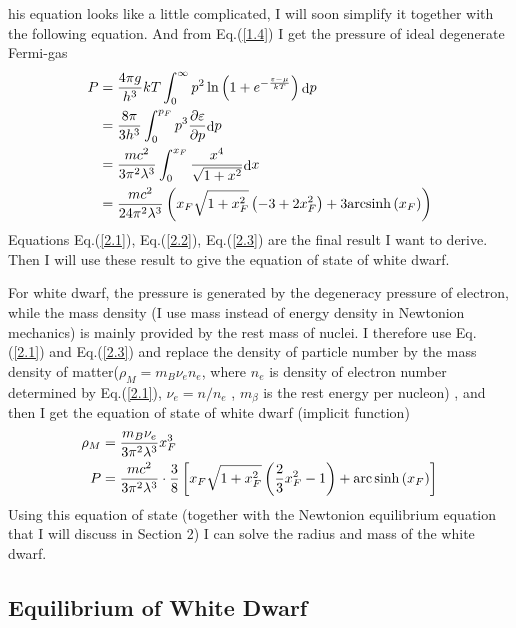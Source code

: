 \documentclass[reprint]{revtex4-1}
\begin{document}
his equation looks like a little complicated, I will soon simplify it together with the following equation. And from Eq.(\ref{1.4}) I get the pressure of ideal degenerate Fermi-gas
\begin{align}
	 P &= {{4\pi g} \over {{h^3}}}kT\int_0^\infty  {{p^2}\ln \left( {1 + {e^{ - {{\varepsilon  - \mu } \over {kT}}}}} \right){\mathop{\rm d}\nolimits} p}  \nonumber \\ 
	& = {{8\pi } \over {3{h^3}}}\int_0^{{p_F}} {{p^3}{{\partial \varepsilon } \over {\partial p}}{\mathop{\rm d}\nolimits} p}    
	 {\rm{       }} \nonumber \\ 
	& = {{m{c^2}} \over {3{\pi ^2}{\lambda ^3}}}\int_0^{{x_F}} {{{{x^4}} \over {\sqrt {1 + {x^2}} }}} {\mathop{\rm d}\nolimits} x \nonumber \\ 
	& = {{m{c^2}} \over {24{\pi ^2}{\lambda ^3}}}\left( {x_F\sqrt {1 + x_F^2} \left( { - 3 + 2x_F^2} \right) + 3{\mathop{\rm arcsinh}\nolimits} \left( {{x_F}} \right)} \right)  \label{2.3}
\end{align}
Equations Eq.(\ref{2.1}), Eq.(\ref{2.2}), Eq.(\ref{2.3}) are the final result I want to derive. Then I will use these result to give the equation of state of white dwarf.\par
For white dwarf, the pressure is generated by the degeneracy pressure of electron, while the mass density (I use mass instead of energy density in Newtonion mechanics) is mainly provided by the rest mass of nuclei. I therefore use Eq.(\ref{2.1})  and Eq.(\ref{2.3}) and replace the density of particle number by the mass density of matter(${\rho _M} = {m_B}{\nu _e}{n_e}$, where $n_e$ is density of electron number determined by Eq.(\ref{2.1}), ${\nu _e} = n/{n_e}$ , $m_\beta$   is the rest energy per nucleon)
, and then I get the equation of state of white dwarf (implicit function)
\begin{align}
{\rho _M} &= {{{m_B}{\nu _e}} \over {3{\pi ^2}{\lambda ^3}}}x_F^3 \nonumber \\
P &= {{m{c^2}} \over {3{\pi ^2}{\lambda ^3}}} \cdot {3 \over 8}\left[ {{x_F}\sqrt {1 + x_F^2} \left( {{2 \over 3}x_F^2 - 1} \right) + {\mathop{\rm arc}\nolimits} \sinh \left( {{x_F}} \right)} \right] \label{2.4}
\end{align}
Using this equation of state (together with the Newtonion equilibrium equation that I will discuss in Section 2) I can solve the radius and mass of the white dwarf.
 

\subsection{Equilibrium of White Dwarf}
\end{document}
